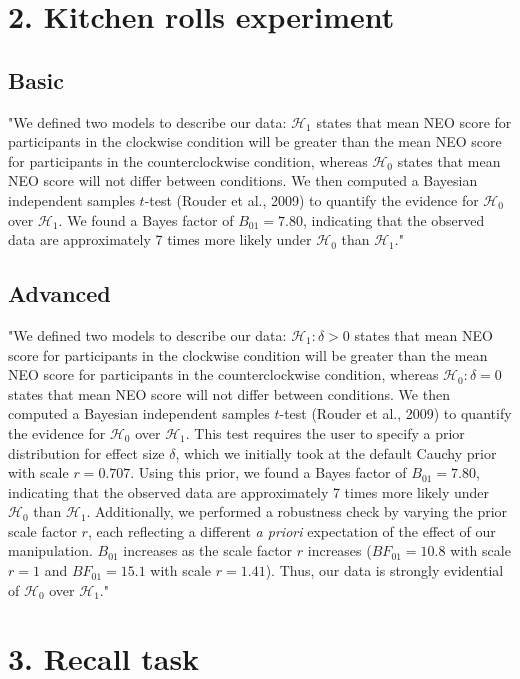 \documentclass[11pt]{article}
\begin{document}
\section*{2. Kitchen rolls experiment}
\label{sec:org1e63c47}
\subsection*{Basic}
\label{sec:orgd95ffff}
"We defined two models to describe our data: \(\mathcal{H}_1\) states that mean NEO score for participants in the clockwise condition will be greater than the mean NEO score for participants in the counterclockwise condition, whereas \(\mathcal{H}_0\) states that mean NEO score will not differ between conditions. We then computed a Bayesian independent samples \(t\)-test (Rouder et al., 2009) to quantify the evidence for \(\mathcal{H}_0\) over \(\mathcal{H}_1\).  We found a Bayes factor of \(B_{01}=7.80\), indicating that the observed data are approximately 7 times more likely under \(\mathcal{H}_0\) than \(\mathcal{H}_1\)."

\subsection*{Advanced}
\label{sec:org63bbefb}
"We defined two models to describe our data: \(\mathcal{H}_1:\delta > 0\) states that mean NEO score for participants in the clockwise condition will be greater than the mean NEO score for participants in the counterclockwise condition, whereas \(\mathcal{H}_0:\delta=0\) states that mean NEO score will not differ between conditions. We then computed a Bayesian independent samples \(t\)-test (Rouder et al., 2009) to quantify the evidence for \(\mathcal{H}_0\) over \(\mathcal{H}_1\). This test requires the user to specify a prior distribution for effect size \(\delta\), which we initially took at the default Cauchy prior with scale \(r=0.707\). Using this prior, we found a Bayes factor of \(B_{01}=7.80\), indicating that the observed data are approximately 7 times more likely under \(\mathcal{H}_0\) than \(\mathcal{H}_1\).  Additionally, we performed a robustness check by varying the prior scale factor \(r\), each reflecting a different \emph{a priori} expectation of the effect of our manipulation. \(B_{01}\) increases as the scale factor \(r\) increases (\(BF_{01}=10.8\) with scale \(r=1\) and \(BF_{01}=15.1\) with scale \(r=1.41\)). Thus, our data is strongly evidential of \(\mathcal{H}_0\) over \(\mathcal{H}_1\)."


\section*{3. Recall task}
\label{sec:org7936ff9}
\end{document}
